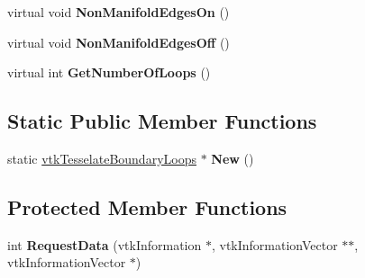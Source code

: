 \begin{DoxyCompactItemize}
\item 
\hypertarget{classvtkTesselateBoundaryLoops_ab6f8a1c541ab5af541c147feb7881865}{
virtual void {\bfseries NonManifoldEdgesOn} ()}
\label{classvtkTesselateBoundaryLoops_ab6f8a1c541ab5af541c147feb7881865}

\item 
\hypertarget{classvtkTesselateBoundaryLoops_a9f9ef6023a89b8834c26584817fa168a}{
virtual void {\bfseries NonManifoldEdgesOff} ()}
\label{classvtkTesselateBoundaryLoops_a9f9ef6023a89b8834c26584817fa168a}

\item 
\hypertarget{classvtkTesselateBoundaryLoops_ac50488eefcf75b4ac58c1a4e783ffbc6}{
virtual int {\bfseries GetNumberOfLoops} ()}
\label{classvtkTesselateBoundaryLoops_ac50488eefcf75b4ac58c1a4e783ffbc6}

\end{DoxyCompactItemize}
\subsection*{Static Public Member Functions}
\begin{DoxyCompactItemize}
\item 
\hypertarget{classvtkTesselateBoundaryLoops_a692880228f37fa88efb09daed5b127e6}{
static \hyperlink{classvtkTesselateBoundaryLoops}{vtkTesselateBoundaryLoops} $\ast$ {\bfseries New} ()}
\label{classvtkTesselateBoundaryLoops_a692880228f37fa88efb09daed5b127e6}

\end{DoxyCompactItemize}
\subsection*{Protected Member Functions}
\begin{DoxyCompactItemize}
\item 
\hypertarget{classvtkTesselateBoundaryLoops_a28a774fb854cea1d2f9d8e47ae5806de}{
int {\bfseries RequestData} (vtkInformation $\ast$, vtkInformationVector $\ast$$\ast$, vtkInformationVector $\ast$)}
\label{classvtkTesselateBoundaryLoops_a28a774fb854cea1d2f9d8e47ae5806de}

\end{DoxyCompactItemize}
